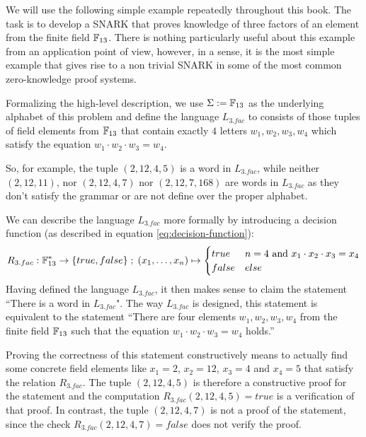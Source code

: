 \begin{example}[3-Factorization]\label{ex:3-factorization} We will use the following simple example repeatedly throughout this book. The task is to develop a SNARK that proves knowledge of three factors of an element from the finite field $\mathbb{F}_{13}$. There is nothing particularly useful about this example from an application point of view, however, in a sense, it is the most simple example that gives rise to a non trivial SNARK in some of the most common zero-knowledge proof systems. 

Formalizing the high-level description, we use $\Sigma := \mathbb{F}_{13}$ as the underlying alphabet of this problem and define the language $L_{3.fac}$ to consists of those tuples of field elements from $\mathbb{F}_{13}$ that contain exactly $4$ letters $w_1,w_2,w_3,w_4$ which satisfy the equation $w_1\cdot w_2\cdot w_3 =w_4$. 

So, for example, the tuple $(2, 12, 4, 5)$ is a word in $L_{3.fac}$, while neither $(2, 12, 11)$, nor $(2, 12, 4, 7)$ nor $(2, 12, 7, 168)$ are words in $L_{3.fac}$ as they don't satisfy the grammar or are not define over the proper alphabet. 

We can describe the language $L_{3.fac}$ more formally by introducing a decision function (as described in equation \ref{eq:decision-function}):
$$
R_{3.fac} : \mathbb{F}_{13}^* \to \{true, false\}\;;\;
(x_1,\ldots,x_n) \mapsto
\begin{cases}
true & n=4 \text{ and } x_1\cdot x_2 \cdot x_3 = x_4\\
false & else
\end{cases}
$$
Having defined the language $L_{3.fac}$, it then makes sense to claim the statement ``There is a word in $L_{3.fac}$". The way $L_{3.fac}$ is designed, this statement is equivalent to the statement ``There are four elements $w_1,w_2,w_3,w_4$ from the finite field $\mathbb{F}_{13}$ such that the equation $w_1\cdot w_2\cdot w_3 =w_4$ holds.''

Proving the correctness of this statement constructively means to actually find some concrete field elements like $x_1= 2$, $x_2 =12$, $x_3=4$ and $x_4 = 5$ that satisfy the relation $R_{3.fac}$. The tuple $(2,12,4,5)$ is therefore a constructive proof for the statement and the computation $R_{3.fac}(2,12,4,5)=true$ is a verification  of that proof. In contrast, the tuple $(2, 12, 4, 7)$ is not a proof of the statement, since the check $R_{3.fac}(2,12,4,7)=false$ does not verify the proof.
\end{example}
